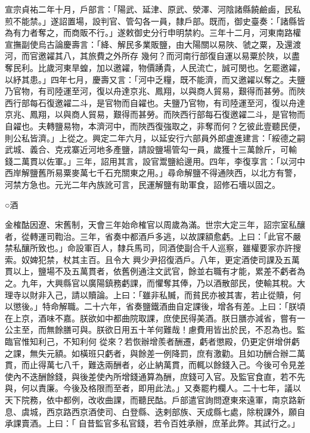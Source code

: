 \begin{pinyinscope}
 宣宗貞祐二年十月，戶部言：「陽武、延津、原武、滎澤、河陰諸縣饒鹼鹵，民私煎不能禁。」遂詔置場，設判官、管勾各一員，隸戶部。既而，御史臺奏：「諸縣皆為有力者奪之，而商販不行。」遂敕御史分行申明禁約。三年十二月，河東南路權宣撫副使烏古論慶壽言：「絳、解民多業販鹽，由大陽關以易陜、虢之粟，及還渡河，而官邀糴其八，其旅費之外所存
 幾何？而河南行部復自運以易粟於陜，以盡奪民利。比歲河東旱蝗，加以邀糴，物價踴貴，人民流亡，誠可閔也。乞罷邀糴，以紓其患。」四年七月，慶壽又言：「河中乏糧，既不能濟，而又邀糴以奪之。夫鹽乃官物，有司陸運至河，復以舟達京兆、鳳翔，以與商人貿易，艱得而甚勞。而陜西行部每石復邀糴二斗，是官物而自糴也。夫鹽乃官物，有司陸運至河，復以舟達京兆、鳳翔，以與商人貿易，艱得而甚勞。而陜西行部每石復邀糴二斗，是官物而自糴也。夫轉鹽易物，本濟河中，而陜西復強取之，非奪而何？乞彼此壹聽民便，則公私皆濟。」上從之。興定二年六月，以延安行六部員外郎盧進建言：「綏德之嗣武城、義合、克戎寨近河地多產鹽，請設鹽場管勾一員，歲獲十三萬餘斤，可輸
 錢二萬貫以佐軍。」三年，詔用其言，設官鬻鹽給邊用。四年，李復享言：「以河中西岸解鹽舊所易粟麥萬七千石充關東之用。」尋命解鹽不得通陜西，以北方有警，河禁方急也。元光二年內族訛可言，民運解鹽有助軍食，詔修石墻以固之。



 ○酒



 金榷酤因遼、宋舊制，天會三年始命榷官以周歲為滿。世宗大定三年，詔宗室私釀者，從轉運司鞫治。三年，省奏中都酒戶多逃，以故課額愈虧。上曰：「此官不嚴禁私釀所致也。」命設軍百人，隸兵馬司，同酒使副合千人巡察，雖權要家亦許搜索。奴婢犯禁，杖其主百。且令大
 興少尹招復酒戶。八年，更定酒使司課及五萬貫以上，鹽場不及五萬貫者，依舊例通注文武官，餘並右職有才能，累差不虧者為之。九年，大興縣官以廣陽鎮務虧課，而懼奪其俸，乃以酒散部民，使輸其稅。大理寺以財非入己，請以贖論。上曰：「雖非私贓，而貧民亦被其害，若止從贖，何以懲後。」特命解職。二十六年，省奏鹽鐵酒曲自定課後，增各有差。上曰：「朕頃在上京，酒味不嘉。朕欲如中都曲院取課，庶使民得美酒。朕日膳亦減省，嘗有一公主至，而無餘膳可與。朕欲日用五十羊何難哉！慮費用皆出於民，不忍為也。監臨官惟知利己，不知利何
 從來？若恢辦增羨者酬遷，虧者懲殿，仍更定併增併虧之課，無失元額。如橫班只虧者，與餘差一例降罰，庶有激勸。且如功酬合辦二萬貫，而止得萬七八千，難迭兩酬者，必止納萬貫，而輒以餘錢入己。今後可令見差使內不迭酬餘錢，與後差使內所增錢通算為酬，庶錢可入官。及監官食直，若不先與，何以責廉。今後及格限而至者，即用此法。」又奏罷杓欄人。二十七年，議以天下院務，依中都例，改收曲課，而聽民酤。戶部遣官詢問遼東來遠軍，南京路新息、虞城，西京路西京酒使司、白登縣、迭剌部族、天成縣七處，除稅課外，願自承課賣酒。上曰：「
 自昔監官多私官錢，若令百姓承辦，庶革此弊。其試行之。」




\end{pinyinscope}
